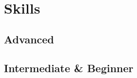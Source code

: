 \section{Skills}

\renewcommand{\listitemsymbol}{+~} %
\subsection{Advanced}



\subsection{Intermediate \& Beginner}

